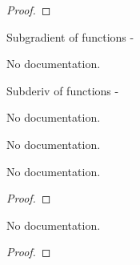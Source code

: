\begin{proof}
    \leanok
\end{proof}

\begin{definition}\label{Banach_HasSubgradientAt}
        \leanok
                Subgradient of functions -
    \end{definition}

\begin{definition}\label{Banach_HasSubgradientWithinAt}
        \leanok
                No documentation.
    \end{definition}

\begin{definition}\label{Banach_SubderivAt}
        \leanok
                Subderiv of functions -
    \end{definition}

\begin{definition}\label{Banach_SubderivWithinAt}
        \leanok
                No documentation.
    \end{definition}

\begin{definition}\label{Epi}
        \leanok
                No documentation.
    \end{definition}

\begin{lemma}\label{EpigraphInterior_existence}
        \leanok
                No documentation.
    \end{lemma}

\begin{proof}
    \leanok
\end{proof}

\begin{lemma}\label{mem_epi_frontier}
        \leanok
                No documentation.
    \end{lemma}

\begin{proof}
    \leanok
\end{proof}

